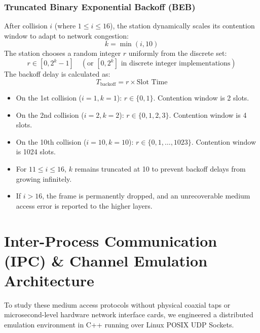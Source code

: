 \documentclass[12pt, a4paper]{article}
\begin{document}
\subsubsection{Truncated Binary Exponential Backoff (BEB)}
After collision $i$ (where $1 \le i \le 16$), the station dynamically scales its contention window to adapt to network congestion:
\begin{equation}
    k = \min(i, 10)
\end{equation}
The station chooses a random integer $r$ uniformly from the discrete set:
\begin{equation}
    r \in [0, 2^k - 1] \quad (\text{or } [0, 2^k] \text{ in discrete integer implementations})
\end{equation}
The backoff delay is calculated as:
\begin{equation}
    T_{\text{backoff}} = r \times \text{Slot Time}
\end{equation}
\begin{itemize}
    \item On the 1st collision ($i=1, k=1$): $r \in \{0, 1\}$. Contention window is 2 slots.
    \item On the 2nd collision ($i=2, k=2$): $r \in \{0, 1, 2, 3\}$. Contention window is 4 slots.
    \item On the 10th collision ($i=10, k=10$): $r \in \{0, 1, \dots, 1023\}$. Contention window is 1024 slots.
    \item For $11 \le i \le 16$, $k$ remains truncated at 10 to prevent backoff delays from growing infinitely.
    \item If $i > 16$, the frame is permanently dropped, and an unrecoverable medium access error is reported to the higher layers.
\end{itemize}


\section{Inter-Process Communication (IPC) \& Channel Emulation Architecture}

To study these medium access protocols without physical coaxial taps or microsecond-level hardware network interface cards, we engineered a distributed emulation environment in C++ running over Linux POSIX UDP Sockets.
\end{document}
